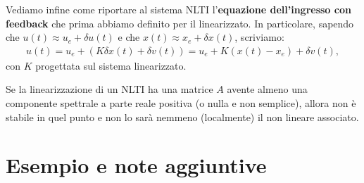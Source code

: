 \documentclass[a4paper]{report}
\begin{document}
\newpage
Vediamo infine come riportare al sistema NLTI l'\textbf{equazione dell'ingresso con feedback} che prima abbiamo definito per il linearizzato. In particolare, sapendo che $u(t) \approx u_e + \delta u(t)$ e che $x(t) \approx x_e + \delta x(t)$, scriviamo:
\begin{align}
	u(t) = u_e + (K\delta x(t) + \delta v(t)) = u_e + K(x(t) - x_e) + \delta v(t),
\end{align}
con $K$ progettata sul sistema linearizzato.
\bb
\begin{prop}
	Se la linearizzazione di un NLTI ha una matrice $A$ avente almeno una componente spettrale a parte reale positiva (o nulla e non semplice), allora non è stabile in quel punto e non lo sarà nemmeno (localmente) il non lineare associato.
\end{prop}

\section{Esempio e note aggiuntive}
\end{document}
